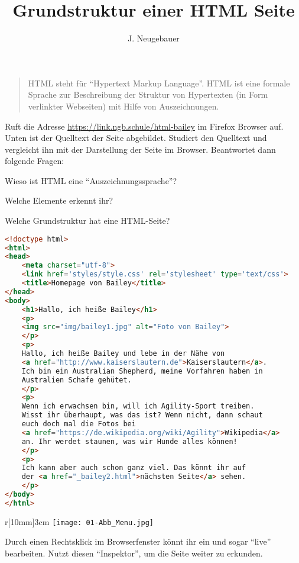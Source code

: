 \documentclass[a4paper,11pt,debug]{scrartcl}
\author{J. Neugebauer}
\title{Grundstruktur einer HTML Seite}
\date{\Heute}
\begin{document}
\ReiheTitel

\begin{quote}
HTML steht für \enquote{Hypertext Markup Language}. HTML ist eine formale Sprache zur Beschreibung der Struktur von Hypertexten (in Form verlinkter Webseiten) mit Hilfe von Auszeichnungen.
\end{quote}

\begin{aufgabe}
Ruft die Adresse \url{https://link.ngb.schule/html-bailey} im Firefox Browser auf. Unten ist der Quelltext der Seite abgebildet. Studiert den Quelltext und vergleicht ihn mit der Darstellung der Seite im Browser. Beantwortet dann folgende Fragen:
\begin{smallenumerate}
	\item  Wieso ist HTML eine \enquote{Auszeichnungssprache}?
	\item Welche Elemente erkennt ihr?
	\item Welche Grundstruktur hat eine HTML-Seite?
\end{smallenumerate}
\begin{lstlisting}[language=HTML,basicstyle=\scriptsize\ttfamily]
<!doctype html>
<html>
<head>
	<meta charset="utf-8">
	<link href='styles/style.css' rel='stylesheet' type='text/css'>
	<title>Homepage von Bailey</title>
</head>
<body>
	<h1>Hallo, ich heiße Bailey</h1>
	<p>
	<img src="img/bailey1.jpg" alt="Foto von Bailey">
	</p>
	<p>
	Hallo, ich heiße Bailey und lebe in der Nähe von 
	<a href="http://www.kaiserslautern.de">Kaiserslautern</a>. 
	Ich bin ein Australian Shepherd, meine Vorfahren haben in 
	Australien Schafe gehütet.
	</p>
	<p>
	Wenn ich erwachsen bin, will ich Agility-Sport treiben. 
	Wisst ihr überhaupt, was das ist? Wenn nicht, dann schaut 
	euch doch mal die Fotos bei 
	<a href="https://de.wikipedia.org/wiki/Agility">Wikipedia</a> 
	an. Ihr werdet staunen, was wir Hunde alles können!
	</p>
	<p>
	Ich kann aber auch schon ganz viel. Das könnt ihr auf 
	der <a href="_bailey2.html">nächsten Seite</a> sehen.
	</p>
</body>
</html>
\end{lstlisting}
\end{aufgabe}

\begin{aufgabe}
\begin{wrapfigure}{r}[10mm]{3cm}
	\texttt{[image: 01-Abb\_Menu.jpg]}
\end{wrapfigure}
Durch einen Rechtsklick im Browserfenster könnt ihr ein  und sogar \enquote{live} bearbeiten. Nutzt diesen \enquote{Inspektor}, um die Seite weiter zu erkunden.
\end{aufgabe}
\end{document}
